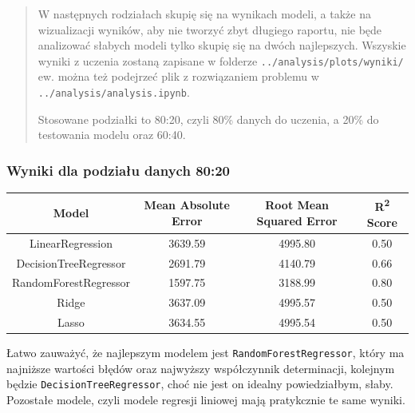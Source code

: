 \documentclass[a4paper]{article}
\begin{document}
\begin{abstract}
    \quad W następnych rodziałach skupię się na wynikach modeli, a także na wizualizacji wyników, aby nie
    tworzyć zbyt długiego raportu, nie będe analizować słabych modeli tylko skupię się na dwóch najlepszych. Wszyskie wyniki z uczenia zostaną zapisane w folderze \texttt{../analysis/plots/wyniki/} ew. można też podejrzeć plik z rozwiązaniem problemu w \texttt{../analysis/analysis.ipynb}.

    \quad Stosowane podziałki to 80:20, czyli 80\% danych do uczenia, a 20\% do testowania modelu oraz 60:40.
\end{abstract}

\subsubsection{Wyniki dla podziału danych 80:20}

\begin{table}[H]
    \centering
    \begin{tabular}{|c|c|c|c|}
        \hline
        \textbf{Model}        & \textbf{Mean Absolute Error} & \textbf{Root Mean Squared Error} & \textbf{R\textsuperscript{2} Score} \\ \hline
        LinearRegression      & 3639.59                      & 4995.80                          & 0.50                                \\ \hline
        DecisionTreeRegressor & 2691.79                      & 4140.79                          & 0.66                                \\ \hline
        RandomForestRegressor & 1597.75                      & 3188.99                          & 0.80                                \\ \hline
        Ridge                 & 3637.09                      & 4995.57                          & 0.50                                \\ \hline
        Lasso                 & 3634.55                      & 4995.54                          & 0.50                                \\ \hline
    \end{tabular}
\end{table}


\quad Łatwo zauważyć, że najlepszym modelem jest \texttt{RandomForestRegressor}, który ma
najniższe wartości błędów oraz najwyższy współczynnik determinacji, kolejnym
będzie \texttt{DecisionTreeRegressor}, choć nie jest on idealny powiedziałbym, słaby.
Pozostałe modele, czyli modele regresji liniowej mają pratykcznie te same wyniki.
\end{document}
